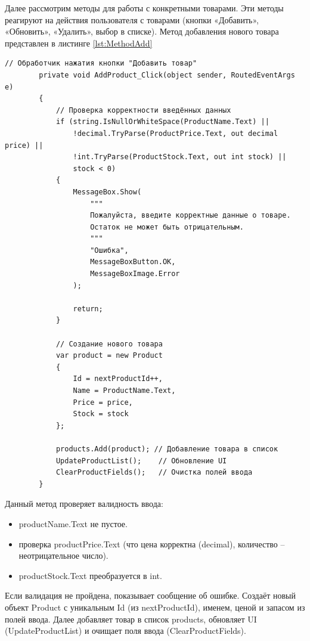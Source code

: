 \documentclass[12pt]{article}
\newcommand{\colorGIT}[1]{\textcolor{CtpGreen}{#1}}
\begin{document}
Далее рассмотрим методы для работы с конкретными товарами. Эти методы реагируют на действия пользователя с товарами (кнопки «Добавить», «Обновить», «Удалить», выбор в списке). Метод добавления нового товара представлен в листинге \ref{lst:MethodAdd}
\begin{lstlisting}[style=csharp_catppuccin, caption=\colorGIT{\href{https://github.com/WebMasterIT/Csharp_Labs/blob/ec375afd16c0647b337cf3d8a79c8bef904fc1be/3lab/StoreManager/MainWindow.xaml.cs\#L53-L80}{Метод}} добавления нового товара, label=lst:MethodAdd]
        // Обработчик нажатия кнопки "Добавить товар"
        private void AddProduct_Click(object sender, RoutedEventArgs e)
        {
            // Проверка корректности введённых данных
            if (string.IsNullOrWhiteSpace(ProductName.Text) ||
                !decimal.TryParse(ProductPrice.Text, out decimal price) ||
                !int.TryParse(ProductStock.Text, out int stock) ||
                stock < 0)
            {
                MessageBox.Show(
                    """
                    Пожалуйста, введите корректные данные о товаре.
                    Остаток не может быть отрицательным.
                    """
                    "Ошибка",
                    MessageBoxButton.OK,
                    MessageBoxImage.Error
                );

                return;
            }

            // Создание нового товара
            var product = new Product
            {
                Id = nextProductId++,
                Name = ProductName.Text,
                Price = price,
                Stock = stock
            };

            products.Add(product); // Добавление товара в список
            UpdateProductList();    // Обновление UI
            ClearProductFields();   // Очистка полей ввода
        }
\end{lstlisting}

Данный метод проверяет валидность ввода:
\begin{itemize}
	\item productName.Text не пустое.
	\item проверка productPrice.Text (что цена корректна (decimal), количество -- неотрицательное число).
	\item productStock.Text преобразуется в int.
\end{itemize}

Если валидация не пройдена, показывает сообщение об ошибке. Создаёт новый объект Product с уникальным Id (из nextProductId), именем, ценой и запасом из полей ввода. Далее добавляет товар в список products, обновляет UI (UpdateProductList) и очищает поля ввода (ClearProductFields).
\end{document}
